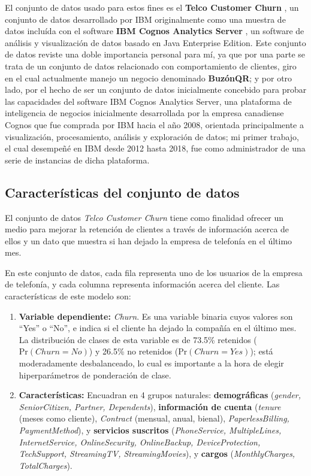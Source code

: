 \documentclass[spanish]{article}
\begin{document}
El conjunto de datos usado para estos fines es el \textbf{Telco Customer Churn} \cite{kaggletelco2026}, un conjunto de datos desarrollado por IBM originalmente como una muestra de datos incluída con el software \textbf{IBM Cognos Analytics Server} \cite{IBMcognos2026}, un software de análisis y visualización de datos basado en Java Enterprise Edition. Este conjunto de datos reviste una doble importancia personal para mí, ya que por una parte se trata de un conjunto de datos relacionado con comportamiento de clientes, giro en el cual actualmente manejo un negocio denominado \textbf{BuzónQR\textregistered{}}; y por otro lado, por el hecho de ser un conjunto de datos inicialmente concebido para probar las capacidades del software IBM Cognos Analytics Server, una plataforma de inteligencia de negocios inicialmente desarrollada por la empresa canadiense Cognos que fue comprada por IBM hacia el año 2008, orientada principalmente a visualización, procesamiento, análisis y exploración de datos; mi primer trabajo, el cual desempeñé en IBM desde 2012 hasta 2018, fue como administrador de una serie de instancias de dicha plataforma.



\subsection{Características del conjunto de datos}

El conjunto de datos \textit{Telco Customer Churn} tiene como finalidad ofrecer un medio para mejorar la retención de clientes a través de información acerca de ellos y un dato que muestra si han dejado la empresa de telefonía en el último mes.

En este conjunto de datos, cada fila representa uno de los usuarios de la empresa de telefonía, y cada columna representa información acerca del cliente. Las características de este modelo son:

\begin{enumerate}
   \item \textbf{Variable dependiente:} \textit{Churn}. Es una variable binaria cuyos valores son ``Yes'' o ``No'', e indica si el cliente ha dejado la compañía en el último mes. La distribución de clases de esta variable es de 73.5\% retenidos ($\mathrm{Pr}(Churn = No)$) y 26.5\% no retenidos ($\mathrm{Pr}(Churn = Yes)$); está moderadamente desbalanceado, lo cual es importante a la hora de elegir hiperparámetros de ponderación de clase.
   \item \textbf{Características:} Encuadran en 4 grupos naturales: \textbf{demográficas} (\textit{gender, SeniorCitizen, Partner, Dependents}), \textbf{información de cuenta} (\textit{tenure} (meses como cliente), \textit{Contract} (mensual, anual, bienal), \textit{PaperlessBilling, PaymentMethod}), y \textbf{servicios suscritos} (\textit{PhoneService, MultipleLines, InternetService, OnlineSecurity, OnlineBackup, DeviceProtection, TechSupport, StreamingTV, StreamingMovies}), y \textbf{cargos} (\textit{MonthlyCharges, TotalCharges}).
\end{enumerate}
\end{document}
